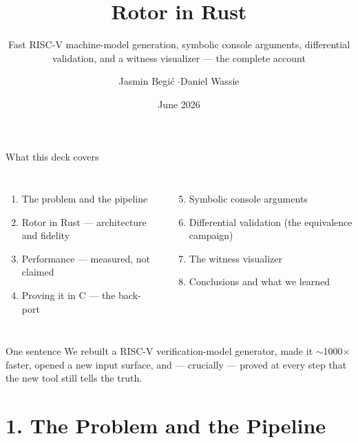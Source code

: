 \documentclass[aspectratio=169]{beamer}
\title{Rotor in Rust}
\subtitle{Fast RISC-V machine-model generation, symbolic console
          arguments, differential validation, and a witness visualizer ---
          the complete account}
\author{Jasmin Begi\'{c} \quad$\cdot$\quad Daniel Wassie}
\institute{Advanced Systems Engineering --- University of Salzburg \\
           supervised by Christoph Kirsch}
\date{June 2026}
\begin{document}
{
\begin{frame}\titlepage\end{frame}}

\begin{frame}{What this deck covers}
  \begin{columns}[T]
    \footnotesize
    \begin{enumerate}
      \item The problem and the pipeline
      \item Rotor in Rust --- architecture and fidelity
      \item Performance --- measured, not claimed
      \item Proving it in C --- the back-port
    \end{enumerate}
    \footnotesize
    \begin{enumerate}\setcounter{enumi}{4}
      \item Symbolic console arguments
      \item Differential validation (the equivalence campaign)
      \item The witness visualizer
      \item Conclusions and what we learned
    \end{enumerate}
  \end{columns}
  \vfill
  \begin{block}{One sentence}
    We rebuilt a RISC-V verification-model generator, made it
    $\sim$1000$\times$ faster, opened a new input surface, and ---
    crucially --- \alert{proved at every step that the new tool still tells
    the truth}.
  \end{block}
\end{frame}

\section{1. The Problem and the Pipeline}
\end{document}
